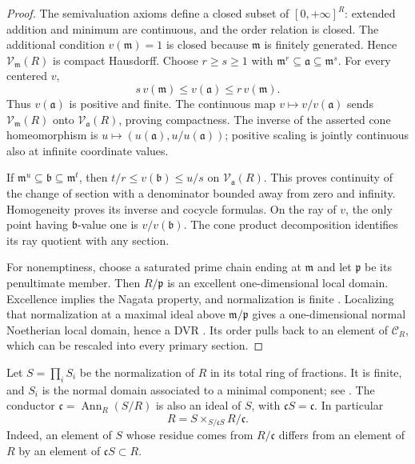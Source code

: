 \begin{proof}
The semivaluation axioms define a closed subset of
$[0,+\infty]^R$: extended addition and minimum are continuous,
and the order relation is closed. The additional condition
$v(\mathfrak m)=1$ is closed because $\mathfrak m$ is finitely
generated. Hence $\mathcal V_{\mathfrak m}(R)$ is compact Hausdorff.
Choose $r\geq s\geq1$ with
$\mathfrak m^r\subseteq\mathfrak a\subseteq\mathfrak m^s$.
For every centered $v$,
\begin{equation}\label{eq:p121-primary-gauge-bounds}
                  s\,v(\mathfrak m)\leq v(\mathfrak a)
                                     \leq r\,v(\mathfrak m).
\tag{70.7b}
\end{equation}
Thus $v(\mathfrak a)$ is positive and finite. The continuous map
$v\mapsto v/v(\mathfrak a)$ sends
$\mathcal V_{\mathfrak m}(R)$ onto $\mathcal V_{\mathfrak a}(R)$,
proving compactness. The inverse of the asserted cone homeomorphism
is $u\mapsto(u(\mathfrak a),u/u(\mathfrak a))$; positive scaling
is jointly continuous also at infinite coordinate values.

If $\mathfrak m^u\subseteq\mathfrak b\subseteq\mathfrak m^t$,
then $t/r\leq v(\mathfrak b)\leq u/s$ on
$\mathcal V_{\mathfrak a}(R)$. This proves continuity of the change
of section with a denominator bounded away from zero and infinity.
Homogeneity proves its inverse and cocycle formulas. On the ray of $v$,
the only point having $\mathfrak b$-value one is $v/v(\mathfrak b)$.
The cone product decomposition identifies its ray quotient with any section.

For nonemptiness, choose a saturated prime chain ending at $\mathfrak m$
and let $\mathfrak p$ be its penultimate member. Then $R/\mathfrak p$
is an excellent one-dimensional local domain. Excellence implies the
Nagata property, and normalization is finite
\cite[Tags 07QV and 035S]{StacksProject}. Localizing that normalization
at a maximal ideal above $\mathfrak m/\mathfrak p$ gives a
one-dimensional normal Noetherian local domain, hence a DVR
\cite[Tag 00PD]{StacksProject}. Its order pulls back to an element of
$\mathcal C_R$, which can be rescaled into every primary section.
\end{proof}

Let $S=\prod_iS_i$ be the normalization of $R$ in its total ring of
fractions. It is finite, and $S_i$ is the normal domain associated to a
minimal component; see \cite[Tags 035P and 035S]{StacksProject}.
The conductor $\mathfrak c=\operatorname{Ann}_R(S/R)$ is also an
ideal of $S$, with $\mathfrak cS=\mathfrak c$. In particular
\begin{equation}\label{eq:p121-conductor-pullback-square}
                    R=S\mathbin{\times}_{S/\mathfrak cS}R/\mathfrak c.
\tag{70.7c}
\end{equation}
Indeed, an element of $S$ whose residue comes from $R/\mathfrak c$
differs from an element of $R$ by an element of $\mathfrak cS\subset R$.

